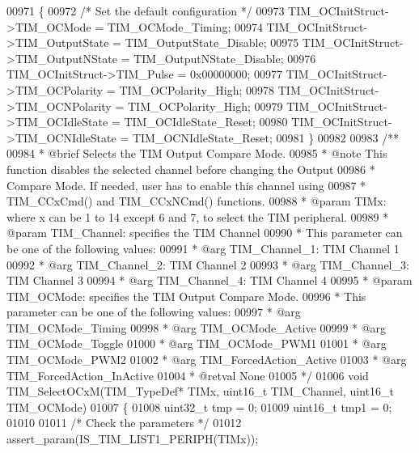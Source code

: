 \begin{DoxyCode}
00971 \{
00972   \textcolor{comment}{/* Set the default configuration */}
00973   TIM\_OCInitStruct->TIM_OCMode = TIM_OCMode_Timing;
00974   TIM\_OCInitStruct->TIM_OutputState = TIM_OutputState_Disable;
00975   TIM\_OCInitStruct->TIM_OutputNState = TIM_OutputNState_Disable;
00976   TIM\_OCInitStruct->TIM_Pulse = 0x00000000;
00977   TIM\_OCInitStruct->TIM_OCPolarity = TIM_OCPolarity_High;
00978   TIM\_OCInitStruct->TIM_OCNPolarity = TIM_OCPolarity_High;
00979   TIM\_OCInitStruct->TIM_OCIdleState = TIM_OCIdleState_Reset;
00980   TIM\_OCInitStruct->TIM_OCNIdleState = TIM_OCNIdleState_Reset;
00981 \}
00982 
00983 \textcolor{comment}{/**}
00984 \textcolor{comment}{  * @brief  Selects the TIM Output Compare Mode.}
00985 \textcolor{comment}{  * @note   This function disables the selected channel before changing the Output}
00986 \textcolor{comment}{  *         Compare Mode. If needed, user has to enable this channel using}
00987 \textcolor{comment}{  *         TIM\_CCxCmd() and TIM\_CCxNCmd() functions.}
00988 \textcolor{comment}{  * @param  TIMx: where x can be 1 to 14 except 6 and 7, to select the TIM peripheral.}
00989 \textcolor{comment}{  * @param  TIM\_Channel: specifies the TIM Channel}
00990 \textcolor{comment}{  *          This parameter can be one of the following values:}
00991 \textcolor{comment}{  *            @arg TIM\_Channel\_1: TIM Channel 1}
00992 \textcolor{comment}{  *            @arg TIM\_Channel\_2: TIM Channel 2}
00993 \textcolor{comment}{  *            @arg TIM\_Channel\_3: TIM Channel 3}
00994 \textcolor{comment}{  *            @arg TIM\_Channel\_4: TIM Channel 4}
00995 \textcolor{comment}{  * @param  TIM\_OCMode: specifies the TIM Output Compare Mode.}
00996 \textcolor{comment}{  *           This parameter can be one of the following values:}
00997 \textcolor{comment}{  *            @arg TIM\_OCMode\_Timing}
00998 \textcolor{comment}{  *            @arg TIM\_OCMode\_Active}
00999 \textcolor{comment}{  *            @arg TIM\_OCMode\_Toggle}
01000 \textcolor{comment}{  *            @arg TIM\_OCMode\_PWM1}
01001 \textcolor{comment}{  *            @arg TIM\_OCMode\_PWM2}
01002 \textcolor{comment}{  *            @arg TIM\_ForcedAction\_Active}
01003 \textcolor{comment}{  *            @arg TIM\_ForcedAction\_InActive}
01004 \textcolor{comment}{  * @retval None}
01005 \textcolor{comment}{  */}
01006 \textcolor{keywordtype}{void} TIM_SelectOCxM(TIM\_TypeDef* TIMx, uint16\_t TIM\_Channel, uint16\_t TIM\_OCMode)
01007 \{
01008   uint32\_t tmp = 0;
01009   uint16\_t tmp1 = 0;
01010 
01011   \textcolor{comment}{/* Check the parameters */}
01012   assert_param(IS\_TIM\_LIST1\_PERIPH(TIMx));

\end{DoxyCode}
